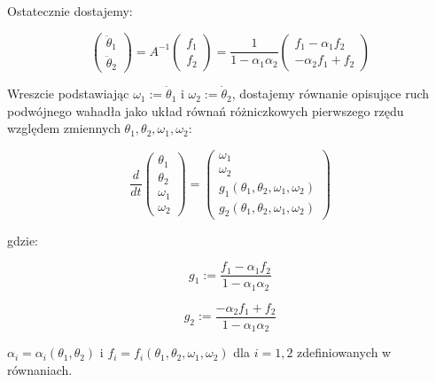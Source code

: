 \documentclass[]{article}
\begin{document}
	Ostatecznie dostajemy:
	
	\begin{equation}
		\begin{pmatrix}
			\ddot{\theta}_1 \\
			\ddot{\theta}_2
		\end{pmatrix}
		= A^{-1}
		\begin{pmatrix}
			f_1 \\
			f_2
		\end{pmatrix}
		= \frac{1}{1 - \alpha_1 \alpha_2}
		\begin{pmatrix}
			f_1 - \alpha_1 f_2 \\
			-\alpha_2 f_1 + f_2
		\end{pmatrix}
	\end{equation}
	
	
	Wreszcie podstawiając \( \omega_1 := \dot{\theta}_1 \) i \( \omega_2 := \dot{\theta}_2 \), dostajemy równanie opisujące ruch podwójnego wahadła jako układ równań różniczkowych pierwszego rzędu względem zmiennych \( \theta_1, \theta_2, \omega_1, \omega_2 \):
	
	
	\begin{equation}
		\frac{d}{dt} \begin{pmatrix}
			\theta_1 \\
			\theta_2 \\
			\omega_1 \\
			\omega_2
		\end{pmatrix}
		= 
		\begin{pmatrix}
			\omega_1 \\
			\omega_2 \\
			g_1(\theta_1, \theta_2, \omega_1, \omega_2) \\
			g_2(\theta_1, \theta_2, \omega_1, \omega_2)
		\end{pmatrix}
	\end{equation}
	
	gdzie:
	
	\begin{equation}
		g_1 := \frac{f_1 - \alpha_1 f_2}{1 - \alpha_1 \alpha_2}
	\end{equation}
	
	\begin{equation}
		g_2 := \frac{-\alpha_2 f_1 + f_2}{1 - \alpha_1 \alpha_2}
	\end{equation}

	
	\( \alpha_i = \alpha_i(\theta_1, \theta_2) \) i \( f_i = f_i(\theta_1, \theta_2, \omega_1, \omega_2) \) dla \( i = 1, 2 \) zdefiniowanych w równaniach.
	
\end{document}
